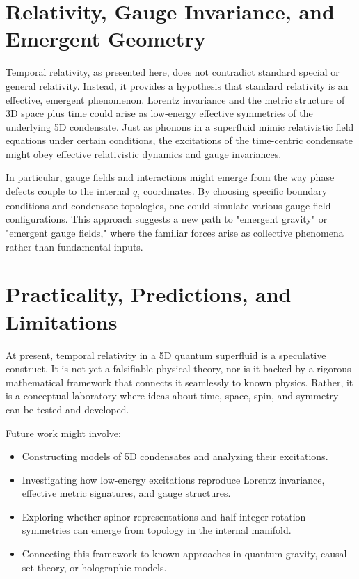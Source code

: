 \documentclass[aps,prd,twocolumn,showpacs,showkeys,superscriptaddress,amsmath,amssymb]{revtex4-2}
\begin{document}
\section{Relativity, Gauge Invariance, and Emergent Geometry}

Temporal relativity, as presented here, does not contradict standard special or general relativity. Instead, it provides a hypothesis that standard relativity is an effective, emergent phenomenon. Lorentz invariance and the metric structure of 3D space plus time could arise as low-energy effective symmetries of the underlying 5D condensate. Just as phonons in a superfluid mimic relativistic field equations under certain conditions, the excitations of the time-centric condensate might obey effective relativistic dynamics and gauge invariances.

In particular, gauge fields and interactions might emerge from the way phase defects couple to the internal $q_i$ coordinates. By choosing specific boundary conditions and condensate topologies, one could simulate various gauge field configurations. This approach suggests a new path to "emergent gravity" or "emergent gauge fields," where the familiar forces arise as collective phenomena rather than fundamental inputs.

\section{Practicality, Predictions, and Limitations}

At present, temporal relativity in a 5D quantum superfluid is a speculative construct. It is not yet a falsifiable physical theory, nor is it backed by a rigorous mathematical framework that connects it seamlessly to known physics. Rather, it is a conceptual laboratory where ideas about time, space, spin, and symmetry can be tested and developed.

Future work might involve:
\begin{itemize}
    \item Constructing models of 5D condensates and analyzing their excitations.
    \item Investigating how low-energy excitations reproduce Lorentz invariance, effective metric signatures, and gauge structures.
    \item Exploring whether spinor representations and half-integer rotation symmetries can emerge from topology in the internal manifold.
    \item Connecting this framework to known approaches in quantum gravity, causal set theory, or holographic models.
\end{itemize}
\end{document}
